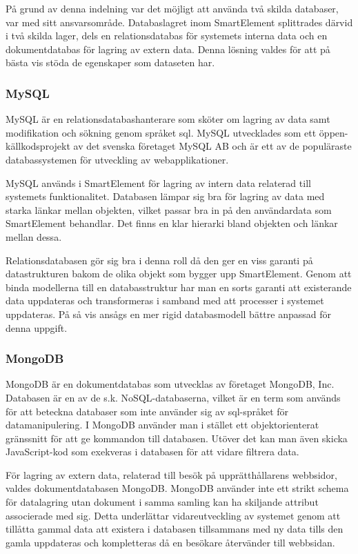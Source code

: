 På grund av denna indelning var det möjligt att använda två skilda databaser, var med sitt ansvarsområde. Databaslagret inom SmartElement splittrades därvid i två skilda lager, dels en relationsdatabas för systemets interna data och en dokumentdatabas för lagring av extern data. Denna lösning valdes för att på bästa vis stöda de egenskaper som dataseten har.

\subsubsection{MySQL}

MySQL är en relationsdatabashanterare som sköter om lagring av data samt modifikation och sökning genom språket \gls{sql}. MySQL utvecklades som ett öppen-källkodsprojekt av det svenska företaget MySQL AB och är ett av de populäraste databassystemen för utveckling av webapplikationer. \citep{dbengines}

MySQL används i SmartElement för lagring av intern data relaterad till systemets funktionalitet. Databasen lämpar sig bra för lagring av data med starka länkar mellan objekten, vilket passar bra in på den användardata som SmartElement behandlar. Det finns en klar hierarki bland objekten och länkar mellan dessa.

Relationsdatabasen gör sig bra i denna roll då den ger en viss garanti på datastrukturen bakom de olika objekt som bygger upp SmartElement. Genom att binda modellerna till en databasstruktur har man en sorts garanti att existerande data uppdateras och transformeras i samband med att processer i systemet uppdateras. På så vis ansågs en mer rigid databasmodell bättre anpassad för denna uppgift.

\subsubsection{MongoDB}

MongoDB är en dokumentdatabas som utvecklas av företaget MongoDB, Inc. Databasen är en av de s.k. NoSQL-databaserna, vilket är en term som används för att beteckna databaser som inte använder sig av \gls{sql}-språket för datamanipulering. I MongoDB använder man i stället ett objektorienterat gränssnitt för att ge kommandon till databasen. Utöver det kan man även skicka JavaScript-kod som exekveras i databasen för att vidare filtrera data. \citep{mongoquery}

För lagring av extern data, relaterad till besök på upprätthållarens webbsidor, valdes dokumentdatabasen MongoDB. MongoDB använder inte ett strikt schema för datalagring utan dokument i samma samling kan ha skiljande attribut associerade med sig. Detta underlättar vidareutveckling av systemet genom att tillåtta gammal data att existera i databasen tillsammans med ny data tills den gamla uppdateras och kompletteras då en besökare återvänder till webbsidan.

